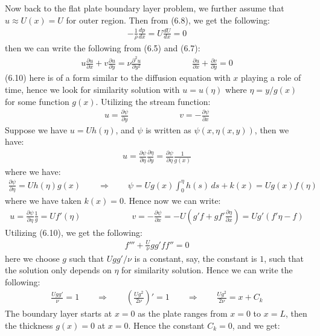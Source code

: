 \documentclass[11pt]{book}
\theoremstyle{break}
\theoremstyle{break}
\newcommand{\pd}{\partial}
\begin{document}
Now back to the flat plate boundary layer problem, we further assume that $u \approx U(x) = U$ for outer region. Then from (6.8), we get the following:
\begin{align*}
-\frac{1}{\rho}\frac{dp}{dx} = U \frac{dU}{dx} = 0
\end{align*}
then we can write the following from (6.5) and (6.7):
\begin{align}
u \frac{\pd u}{\pd x} + v \frac{\pd u}{\pd y} = \nu \frac{\pd^2 u}{\pd y^2}\qquad\qquad\qquad \frac{\pd u}{\pd x}+\frac{\pd v}{\pd y} = 0
\end{align} 
(6.10) here is of a form similar to the diffusion equation with $x$ playing a role of time, hence we look for similarity solution with $u = u(\eta)$ where $\eta = y/g(x)$ for some function $g(x)$. Utilizing the stream function:
\begin{align*}
u  = \frac{\pd \psi}{\pd y} \qquad\qquad\qquad v = -\frac{\pd \psi}{\pd x}
\end{align*}
Suppose we have $u = Uh(\eta)$, and $\psi$ is written as $\psi(x,\eta(x,y))$, then we have:
\begin{align*}
u = \frac{\pd \psi}{\pd \eta} \frac{\pd \eta}{\pd y} = \frac{\pd \psi}{\pd \eta}\frac{1}{g(x)} 
\end{align*}
where we have:
\begin{align*}
\frac{\pd \psi}{\pd \eta} = Uh(\eta)g(x) \qquad \Rightarrow \qquad \psi = U g(x) \int_0^{\eta} h(s) \, ds + k(x) = Ug(x) f(\eta)
\end{align*}
where we have taken $k(x) = 0$. Hence now we can write:
\begin{align*}
u = \frac{\pd\psi}{\pd \eta}\frac{1}{g}=Uf'(\eta)\qquad\qquad\qquad v = -\frac{\pd \psi}{\pd x} = -U\left(g'f + gf' \frac{\pd \eta}{\pd x}\right) = Ug'(f'\eta - f)
\end{align*}
Utilizing (6.10), we get the following:
\begin{align*}
f''' + \frac{U}{\nu}gg'ff'' = 0
\end{align*}
here we choose $g$ such that $Ugg'/\nu$ is a constant, say, the constant is $1$, such that the solution only depends on $\eta$ for similarity solution. Hence we can write the following:
\begin{align*}
\frac{Ugg'}{\nu} = 1 \qquad \Rightarrow \qquad \left( \frac{Ug^2}{2\nu}\right)' = 1 \qquad \Rightarrow \qquad \frac{Ug^2}{2\nu} = x + C_k
\end{align*}
The boundary layer starts at $x = 0$ as the plate ranges from $x = 0$ to $x =L$, then the thickness $g(x) = 0$ at $x = 0$. Hence the constant $C_k = 0$, and we get:
\end{document}
